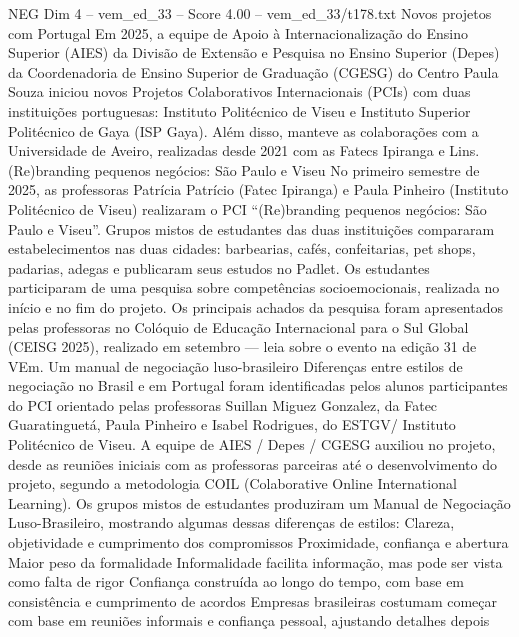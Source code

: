 \begin{textsample}{NEG Dim 4 – vem\_ed\_33 – Score 4.00 – vem\_ed\_33/t178.txt}  \label{ex:f4_neg_044}
Novos projetos com Portugal Em 2025, a equipe de Apoio à Internacionalização do Ensino Superior (AIES) da Divisão de Extensão e Pesquisa no Ensino Superior (Depes) da Coordenadoria de Ensino Superior de Graduação (CGESG) do Centro Paula Souza iniciou novos Projetos Colaborativos Internacionais (PCIs) com duas instituições portuguesas: Instituto Politécnico de Viseu e Instituto Superior Politécnico de Gaya (ISP Gaya).
Além disso, manteve as colaborações com a Universidade de Aveiro, realizadas desde 2021 com as Fatecs Ipiranga e Lins. (Re)branding pequenos negócios: São Paulo e Viseu No primeiro semestre de 2025, as professoras Patrícia Patrício (Fatec Ipiranga) e Paula Pinheiro (Instituto Politécnico de Viseu) realizaram o PCI “(Re)branding pequenos negócios: São Paulo e Viseu”.
Grupos mistos de estudantes das duas instituições compararam estabelecimentos nas duas cidades: barbearias, cafés, confeitarias, pet shops, padarias, adegas e publicaram seus estudos no Padlet.
Os estudantes participaram de uma pesquisa sobre competências socioemocionais, realizada no início e no fim do projeto.
Os principais achados da pesquisa foram apresentados pelas professoras no Colóquio de Educação Internacional para o Sul Global (CEISG 2025), realizado em setembro — leia sobre o evento na edição 31 de VEm.
Um manual de negociação luso-brasileiro Diferenças entre estilos de negociação no Brasil e em Portugal foram identificadas pelos alunos participantes do PCI orientado pelas professoras Suillan Miguez Gonzalez, da Fatec Guaratinguetá, Paula Pinheiro e Isabel Rodrigues, do ESTGV/ Instituto Politécnico de Viseu.
A equipe de AIES / Depes / CGESG auxiliou no projeto, desde as reuniões iniciais com as professoras parceiras até o desenvolvimento do projeto, segundo a metodologia COIL (Colaborative Online International Learning).
Os grupos mistos de estudantes produziram um Manual de Negociação Luso-Brasileiro, mostrando algumas dessas diferenças de estilos: Clareza, objetividade e cumprimento dos compromissos Proximidade, confiança e abertura Maior peso da formalidade Informalidade facilita informação, mas pode ser vista como falta de rigor Confiança construída ao longo do tempo, com base em consistência e cumprimento de acordos Empresas brasileiras costumam começar com base em reuniões informais e confiança pessoal, ajustando detalhes depois

\end{textsample}
